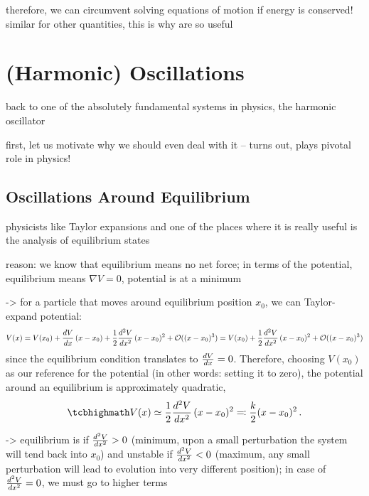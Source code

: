 \documentclass[../class_mech_main.tex]{subfiles}
\begin{document}
therefore, we can circumvent solving equations of motion if energy is conserved! similar for other quantities, this is why  are so useful



	\section{(Harmonic) Oscillations}
back to one of the absolutely fundamental systems in physics, the harmonic oscillator

first, let us motivate why we should even deal with it -- turns out, plays pivotal role in physics!



		\subsection{Oscillations Around Equilibrium}
		\label{subsec:osc_around_equ}
physicists like Taylor expansions and one of the places where it is really useful is the analysis of equilibrium states

reason: we know that equilibrium means no net force; in terms of the potential, equilibrium means $\nabla V = 0$, potential is at a minimum

-> for a particle that moves around equilibrium position $x_0$, we can Taylor-expand potential:
\begin{equation*}
	V(x) = V(x_0) + \dv{V}{x}(x_0) \, (x - x_0) + \frac{1}{2} \dv[2]{V}{x}(x_0) \, (x - x_0)^2 + \mathcal{O}((x - x_0)^3) = V(x_0) + \frac{1}{2} \dv[2]{V}{x}(x_0) \, (x - x_0)^2 + \mathcal{O}((x - x_0)^3)
\end{equation*}
since the equilibrium condition translates to $\dv{V}{x}(x_0) = 0$. Therefore, choosing $V(x_0)$ as our reference for the potential (in other words: setting it to zero), the potential around an equilibrium is approximately quadratic,
\begin{equation}
	\eqbox{
		V(x) \simeq \frac{1}{2} \dv[2]{V}{x} \, (x - x_0)^2 \eqqcolon \frac{k}{2} (x - x_0)^2
	}
	\, .
\end{equation}

-> equilibrium is  if $\dv[2]{V}{x}(x_0) > 0$ (minimum, upon a small perturbation the system will tend back into $x_0$) and unstable if $\dv[2]{V}{x}(x_0) < 0$ (maximum, any small perturbation will lead to evolution into very different position); in case of $\dv[2]{V}{x}(x_0) = 0$, we must go to higher terms
\end{document}
